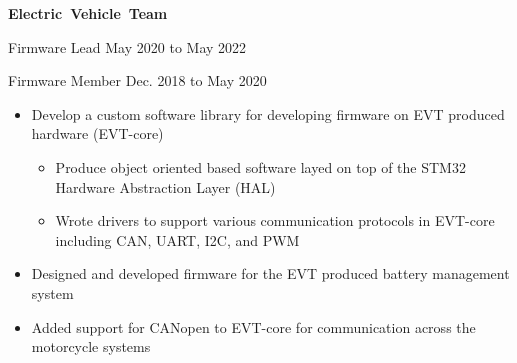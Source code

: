 \documentclass{article}
\newcommand{\rSubSubSection}[1] {
  \textbf{{\fontsize{0.35cm}{0.45cm}\selectfont \hbox{#1}}}
}
\begin{document}
\rSubSubSection{Electric Vehicle Team}\par
Firmware Lead \hfill May 2020 to May 2022 \par
Firmware Member \hfill Dec. 2018 to May 2020
\vspace{-10pt}
\begin{itemize}
    \setlength\itemsep{0pt}
    \setlength{\parskip}{0pt}
    \item Develop a custom software library for developing firmware on EVT produced hardware (EVT-core)
    \begin{itemize}
        \setlength\itemsep{0pt}
        \setlength{\parskip}{0pt}
        \item Produce object oriented based software layed on top of the STM32 Hardware Abstraction Layer (HAL)
        \item Wrote drivers to support various communication protocols in EVT-core including CAN, UART, I2C, and PWM
    \end{itemize}
    \item Designed and developed firmware for the EVT produced battery management system
    \item Added support for CANopen to EVT-core for communication across the motorcycle systems
\end{itemize}
\vspace{-10pt}
\end{document}
